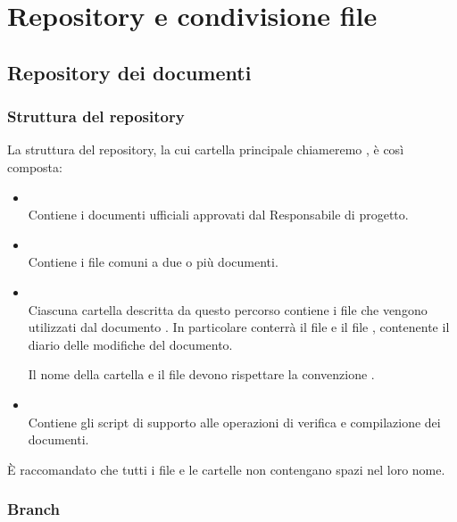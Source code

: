 \section{Repository e condivisione file}

\subsection{Repository dei documenti}

\subsubsection{Struttura del repository}

La struttura del repository, la cui cartella principale chiameremo , è così composta:
\begin{itemize}
 \item \textbf{} \\
	Contiene i documenti ufficiali approvati dal Responsabile di progetto.

 \item \textbf{} \\
	Contiene i file comuni a due o più documenti.

 \item \textbf{} \\
	Ciascuna cartella descritta da questo percorso contiene i file che vengono utilizzati dal documento . In particolare conterrà il file  e il file , contenente il diario delle modifiche del documento.
	
	Il nome della cartella  e il file  devono rispettare la convenzione .

 \item \textbf{} \\
	Contiene gli script di supporto alle operazioni di verifica e compilazione dei documenti.
\end{itemize}

È raccomandato che tutti i file e le cartelle non contengano spazi nel loro nome.

\subsubsection{Branch}

